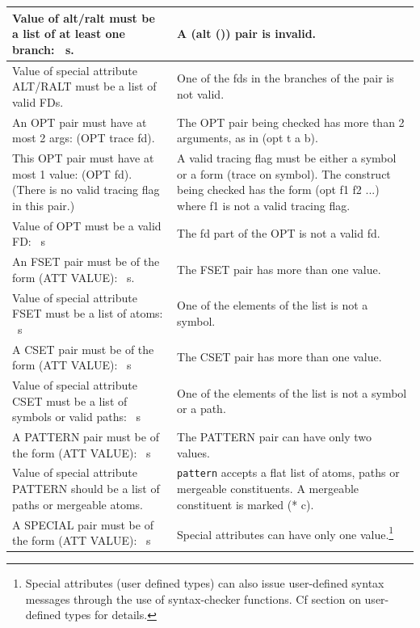 \documentclass[10pt,a4paper]{report}
\begin{document}
\begin{center}
\begin{tabular}{ | p{3in} | p{3in} |}
Value of alt/ralt must be a list of at least one branch: ~s. &A (alt ())
pair is invalid.  \\ \hline

Value of special attribute ALT/RALT must be a list of valid FDs. &One of
the fds in the branches of the pair is not valid.  \\ \hline

An OPT pair must have at most 2 args: (OPT trace fd).& The OPT pair being
checked has more than 2 arguments, as in (opt t a b).  \\ \hline

This OPT pair must have at most 1 value: (OPT fd). (There is no valid
tracing flag in this pair.)& A valid tracing flag must be either a symbol
or a form (trace on symbol).  The construct being checked has the form
(opt f1 f2 ...) where f1 is not a valid tracing flag.  \\ \hline

Value of OPT must be a valid FD: ~s &The fd part of the OPT is not a valid fd.  \\ \hline

An FSET pair must be of the form (ATT VALUE): ~s. &The FSET pair has more
than one value.  \\ \hline

Value of special attribute FSET must be a list of atoms: ~s &One of the
elements of the list is not a symbol.  \\ \hline

A CSET pair must be of the form (ATT VALUE): ~s &The CSET pair has more
than one value.  \\ \hline

Value of special attribute CSET must be a list of symbols or valid paths: ~s
&One of the elements of the list is not a symbol or a path.  \\ \hline

A PATTERN pair must be of the form (ATT VALUE): ~s &The PATTERN pair can
have only two values.  \\ \hline

Value of special attribute PATTERN should be a list of paths or
mergeable atoms. &{\tt pattern} accepts a flat list of atoms, paths or
mergeable constituents. A mergeable constituent is marked (* c).
\index{pattern (keyword)} \index{mergeable constituents (in pattern)}
\index{star notation in patterns}  \\ \hline

A SPECIAL pair must be of the form (ATT VALUE): ~s &Special attributes can
have only one value.\footnote{Special attributes (user defined types)  can also
issue user-defined syntax messages through the use of syntax-checker
functions.  Cf section on user-defined types for details.}  \\ \hline


\end{tabular}
\end{center}
\end{document}
